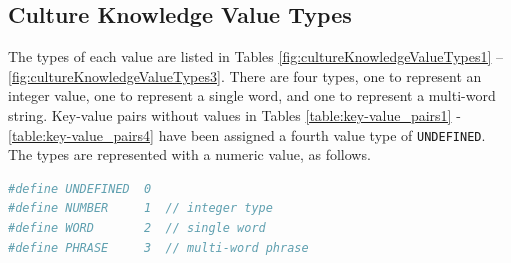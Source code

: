 \documentclass{CSSRforAfrica}
\begin{document}
\subsection{Culture Knowledge Value Types}
The types of each value are listed in Tables  \ref{fig:cultureKnowledgeValueTypes1} --  \ref{fig:cultureKnowledgeValueTypes3}. There are four types, one to represent an integer value, one to represent a single word, and one to represent a multi-word string. Key-value pairs without values in Tables \ref{table:key-value_pairs1} -\ref{table:key-value_pairs4} have been assigned a fourth value type of {\small \tt UNDEFINED}.  The types are represented with a numeric value, as follows.

\begin{lstlisting}[style=withoutNumbering, language=bash]
#define UNDEFINED  0
#define NUMBER     1  // integer type
#define WORD       2  // single word
#define PHRASE     3  // multi-word phrase
\end{lstlisting}
\end{document}
